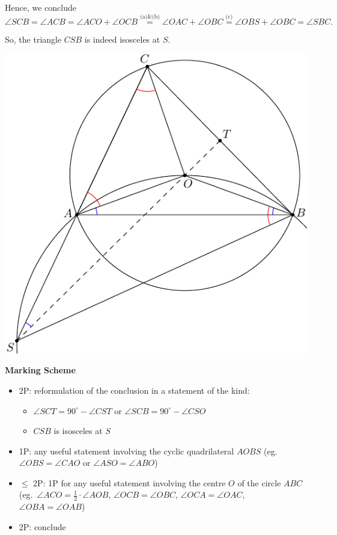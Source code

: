 {Hence, we conclude
\[
\angle SCB=\angle ACB=\angle ACO+\angle OCB\stackrel{\text{(a)\&(b)}}{=}\angle OAC+\angle OBC\stackrel{\text{(c)}}{=}\angle OBS+\angle OBC=\angle SBC.
\]

So, the triangle $CSB$ is indeed isosceles at $S$.

\begin{center}
\includegraphics{g1fig.pdf}
\end{center}

\bigskip

\textbf{Marking Scheme}

\begin{itemize}
    \item 2P: reformulation of the conclusion in a statement of the kind:
    \begin{itemize}
    \item $\angle SCT=90^\circ-\angle CST$ or $\angle SCB=90^\circ-\angle CSO$
    \item $CSB$ is isosceles at $S$
    \end{itemize}
    \item 1P: any useful statement involving the cyclic quadrilateral $AOBS$ (eg.\ $\angle OBS=\angle CAO$ or $\angle ASO=\angle ABO$)
    \item $\leq$ 2P: 1P for any useful statement involving the centre $O$ of the circle $ABC$ (eg.\ $\angle ACO=\frac{1}{2}\cdot \angle AOB$, $\angle OCB=\angle OBC$, $\angle OCA=\angle OAC$, $\angle OBA=\angle OAB$) 
    \item 2P: conclude
\end{itemize}
}

